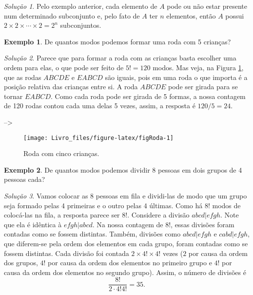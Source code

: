 \documentclass[]{book}
\theoremstyle{definition}
\theoremstyle{definition}
\newtheorem{example}{Exemplo}[chapter]
\theoremstyle{definition}
\theoremstyle{remark}
\newtheorem*{solution}{Solução}
\begin{document}
\begin{solution}
\iffalse{} {Solução. } \fi{}Pelo exemplo anterior, cada elemento de \(A\) pode ou não estar presente num determinado subconjunto e, pelo fato de \(A\) ter \(n\) elementos, então \(A\) possui \(2\times 2 \times \cdots \times 2 = 2^{n}\) subconjuntos.
\end{solution}

\begin{example}
\protect\hypertarget{exm:unnamed-chunk-32}{}{\label{exm:unnamed-chunk-32} }De quantos modos podemos formar uma roda com 5 crianças?
\end{example}

\begin{solution}
\iffalse{} {Solução. } \fi{}Parece que para formar a roda com as crianças basta escolher uma ordem para elas, o que pode ser feito de \(5!=120\) modos.
Mas veja, na Figura \ref{fig:figRoda}, que as rodas \(ABCDE\) e \(EABCD\) são iguais, pois em uma roda o que importa é a posição relativa das crianças entre si.
A roda \(ABCDE\) pode ser girada para se tornar \(EABCD\).
Como cada roda pode ser girada de 5 formas, a nossa contagem de 120 rodas contou cada uma delas 5 vezes, assim, a resposta é \(120/5=24\).
\end{solution}

--\textgreater{}

\begin{figure}

{\centering \texttt{[image: Livro\_files/figure-latex/figRoda-1]} 

}

\caption{Roda com cinco crianças.}\label{fig:figRoda}
\end{figure}

\begin{example}
\protect\hypertarget{exm:unnamed-chunk-34}{}{\label{exm:unnamed-chunk-34} }De quantos modos podemos dividir 8 pessoas em dois grupos de 4 pessoas cada?
\end{example}

\begin{solution}
\iffalse{} {Solução. } \fi{}Vamos colocar as 8 pessoas em fila e dividi-las de modo que um grupo seja formado pelas 4 primeiras e o outro pelas 4 últimas.
Como há \(8!\) modos de colocá-las na fila, a resposta parece ser \(8!\).
Considere a divisão \(abcd|efgh\).
Note que ela é idêntica à \(efgh|abcd\).
Na nossa contagem de \(8!\), essas divisões foram contadas como se fossem distintas.
Também, divisões como \(abcd|efgh\) e \(cabd|efgh\), que diferem-se pela ordem dos elementos em cada grupo, foram contadas como se fossem distintas.
Cada divisão foi contada \(2\times 4!\times 4!\) vezes (\(2\) por causa da ordem dos grupos, \(4!\) por causa da ordem dos elementos no primeiro grupo e \(4!\) por causa da ordem dos elementos no segundo grupo).
Assim, o número de divisões é
\[\frac{8!}{2\cdot 4!4!}=35.\]
\end{solution}
\end{document}

